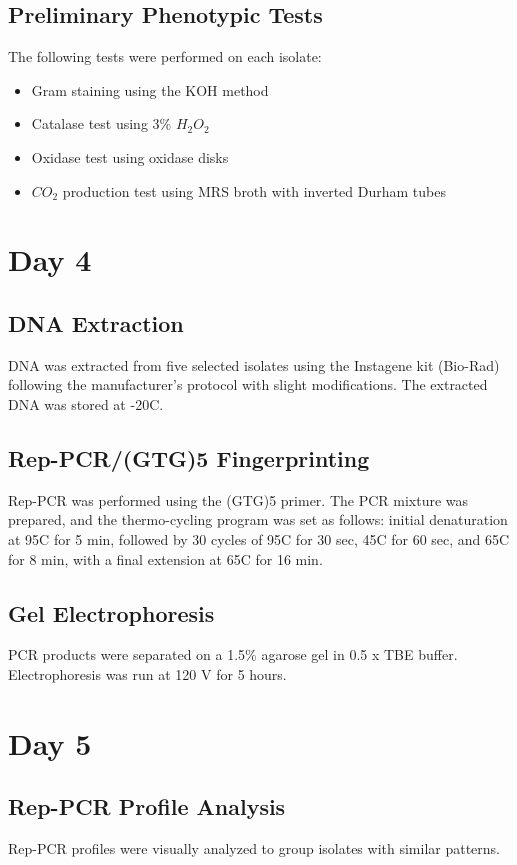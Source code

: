 \subsection*{Preliminary Phenotypic Tests}
The following tests were performed on each isolate:

\begin{itemize}
    \item Gram staining using the KOH method
    \item Catalase test using 3\% $H_2O_2$
    \item Oxidase test using oxidase disks
    \item $CO_2$ production test using MRS broth with inverted Durham tubes
\end{itemize}

\section{Day 4}
\subsection*{DNA Extraction}
DNA was extracted from five selected isolates using the Instagene kit (Bio-Rad) following the manufacturer's protocol with slight modifications. The extracted DNA was stored at -20\textdegree C.

\subsection*{Rep-PCR/(GTG)5 Fingerprinting}
Rep-PCR was performed using the (GTG)5 primer. The PCR mixture was prepared, and the thermo-cycling program was set as follows: initial denaturation at 95\textdegree C for 5 min, followed by 30 cycles of 95\textdegree C for 30 sec, 45\textdegree C for 60 sec, and 65\textdegree C for 8 min, with a final extension at 65\textdegree C for 16 min.

\subsection*{Gel Electrophoresis}
PCR products were separated on a 1.5\% agarose gel in 0.5 x TBE buffer. Electrophoresis was run at 120 V for 5 hours.

\section{Day 5}
\subsection*{Rep-PCR Profile Analysis}
Rep-PCR profiles were visually analyzed to group isolates with similar patterns.

